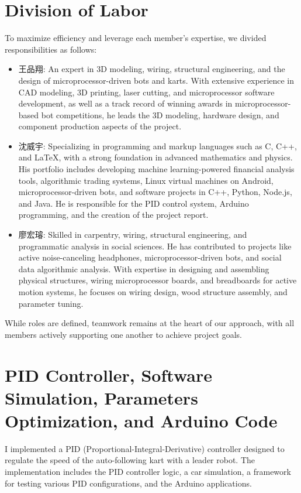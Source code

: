 \documentclass[a4paper,12pt]{article}
\begin{document}
\section{Division of Labor}
To maximize efficiency and leverage each member's expertise, we divided responsibilities as follows:
\begin{itemize}
\item 王品翔: An expert in 3D modeling, wiring, structural engineering, and the design of microprocessor-driven bots and karts. With extensive experience in CAD modeling, 3D printing, laser cutting, and microprocessor software development, as well as a track record of winning awards in microprocessor-based bot competitions, he leads the 3D modeling, hardware design, and component production aspects of the project.
\item 沈威宇: Specializing in programming and markup languages such as C, C++, and LaTeX, with a strong foundation in advanced mathematics and physics. His portfolio includes developing machine learning-powered financial analysis tools, algorithmic trading systems, Linux virtual machines on Android, microprocessor-driven bots, and software projects in C++, Python, Node.js, and Java. He is responsible for the PID control system, Arduino programming, and the creation of the project report.
\item 廖宏璿: Skilled in carpentry, wiring, structural engineering, and programmatic analysis in social sciences. He has contributed to projects like active noise-canceling headphones, microprocessor-driven bots, and social data algorithmic analysis. With expertise in designing and assembling physical structures, wiring microprocessor boards, and breadboards for active motion systems, he focuses on wiring design, wood structure assembly, and parameter tuning.
\end{itemize}
While roles are defined, teamwork remains at the heart of our approach, with all members actively supporting one another to achieve project goals.

\section{PID Controller, Software Simulation, Parameters Optimization, and Arduino Code}
I implemented a PID (Proportional-Integral-Derivative) controller designed to regulate the speed of the auto-following kart with a leader robot. The implementation includes the PID controller logic, a car simulation, a framework for testing various PID configurations, and the Arduino applications.
\end{document}
